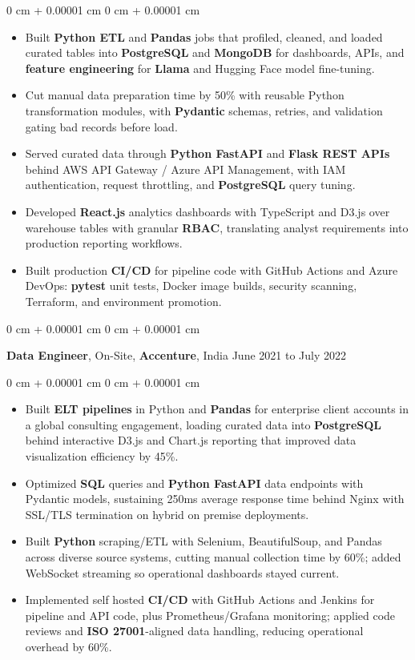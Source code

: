 \documentclass[10pt, letterpaper]{article}
\newenvironment{highlights}{
    \begin{itemize}[
        topsep=0.04 cm,
        parsep=0.04 cm,
        partopsep=0pt,
        itemsep=0pt,
        leftmargin=0 cm + 10pt
    ]
}{
    \end{itemize}
} %
\newenvironment{onecolentry}{
    \begin{adjustwidth}{
        0 cm + 0.00001 cm
    }{
        0 cm + 0.00001 cm
    }
}{
    \end{adjustwidth}
} %
\newcommand{\resumeheading}[2]{%
    \begin{onecolentry}
        #1 \hfill #2
    \end{onecolentry}
} %
\begin{document}
\begin{onecolentry}
\begin{highlights}
	\item Built \textbf{Python ETL} and \textbf{Pandas} jobs that profiled, cleaned, and loaded curated tables into \textbf{PostgreSQL} and \textbf{MongoDB} for dashboards, APIs, and \textbf{feature engineering} for \textbf{Llama} and Hugging Face model fine-tuning.
	\item Cut manual data preparation time by 50\% with reusable Python transformation modules, with \textbf{Pydantic} schemas, retries, and validation gating bad records before load.
	\item Served curated data through \textbf{Python FastAPI} and \textbf{Flask REST APIs} behind AWS API Gateway / Azure API Management, with IAM authentication, request throttling, and \textbf{PostgreSQL} query tuning.
	\item Developed \textbf{React.js} analytics dashboards with TypeScript and D3.js over warehouse tables with granular \textbf{RBAC}, translating analyst requirements into production reporting workflows.
	\item Built production \textbf{CI/CD} for pipeline code with GitHub Actions and Azure DevOps: \textbf{pytest} unit tests, Docker image builds, security scanning, Terraform, and environment promotion.
\end{highlights}
\end{onecolentry}




\vspace{0.15 cm}
\resumeheading{\textbf{Data Engineer}, On-Site, \textbf{Accenture}, India}{June 2021 to July 2022}

\begin{onecolentry}
\begin{highlights}
	\item Built \textbf{ELT pipelines} in Python and \textbf{Pandas} for enterprise client accounts in a global consulting engagement, loading curated data into \textbf{PostgreSQL} behind interactive D3.js and Chart.js reporting that improved data visualization efficiency by 45\%.
	\item Optimized \textbf{SQL} queries and \textbf{Python FastAPI} data endpoints with Pydantic models, sustaining 250ms average response time behind Nginx with SSL/TLS termination on hybrid on premise deployments.
	\item Built \textbf{Python} scraping/ETL with Selenium, BeautifulSoup, and Pandas across diverse source systems, cutting manual collection time by 60\%; added WebSocket streaming so operational dashboards stayed current.
	\item Implemented self hosted \textbf{CI/CD} with GitHub Actions and Jenkins for pipeline and API code, plus Prometheus/Grafana monitoring; applied code reviews and \textbf{ISO 27001}-aligned data handling, reducing operational overhead by 60\%.
\end{highlights}
\end{onecolentry}
\end{document}
